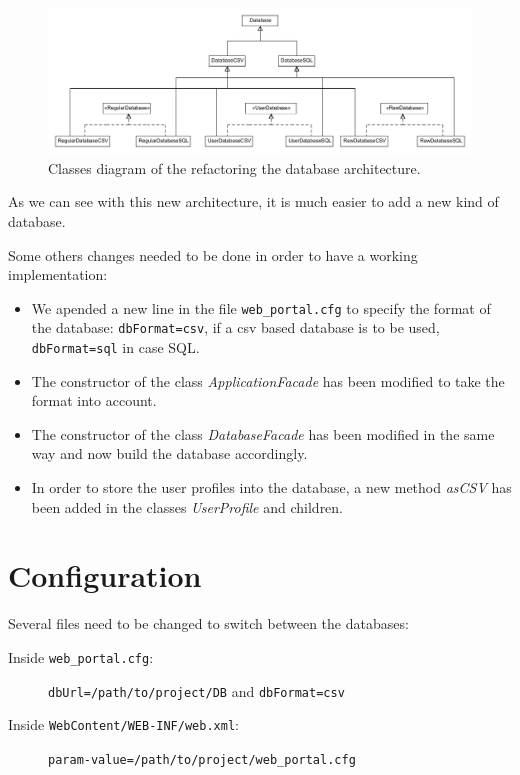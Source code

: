 \documentclass[a4paper,10pt]{article}
\begin{document}
\begin{figure}[h]
 \includegraphics[width=\textwidth]{ClassDiagram.png}
 \caption{Classes diagram of the refactoring the database architecture.}
 \label{fig:classesDiagram}
\end{figure}

As we can see with this new architecture, it is much easier to add a new kind of database.
\newline

\pagebreak

Some others changes needed to be done in order to have a working implementation:
\begin{itemize}
	\item We apended a new line in the file \texttt{web\_portal.cfg} to specify the format of the database: \texttt{dbFormat=csv}, if a csv based database is to be used, \texttt{dbFormat=sql} in case SQL.
 \item The constructor of the class \textit{ApplicationFacade} has been modified to take the format into account.
 \item The constructor of the class \textit{DatabaseFacade} has been modified in the same way and now build the database accordingly.
 \item In order to store the user profiles into the database, a new method \textit{asCSV} has been added in the classes \textit{UserProfile} and children.
\end{itemize}

\section{Configuration}
Several files need to be changed to switch between the databases:
\begin{description}
\item[Inside \texttt{web\_portal.cfg}:] \texttt{dbUrl=/path/to/project/DB} and \texttt{dbFormat=csv}
\item[Inside \texttt{WebContent/WEB-INF/web.xml}:] \texttt{param-value=/path/to/project/web\_portal.cfg}
\end{description}
\end{document}
